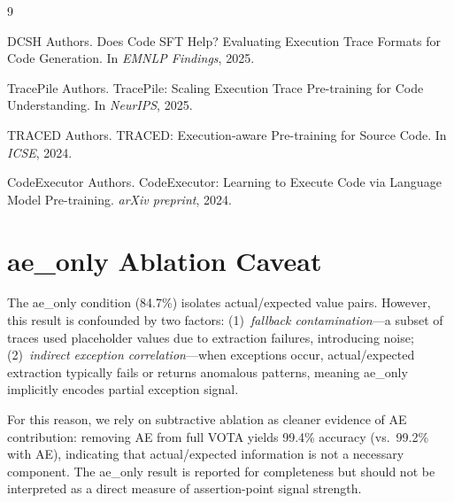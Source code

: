 \documentclass[11pt]{article}
\newcommand{\vota}{\textsc{VOTA}}
\begin{document}

\begin{thebibliography}{9}

{DCSH Authors}.
\newblock Does Code SFT Help? Evaluating Execution Trace Formats for Code Generation.
\newblock In \emph{EMNLP Findings}, 2025.

{TracePile Authors}.
\newblock TracePile: Scaling Execution Trace Pre-training for Code Understanding.
\newblock In \emph{NeurIPS}, 2025.

{TRACED Authors}.
\newblock TRACED: Execution-aware Pre-training for Source Code.
\newblock In \emph{ICSE}, 2024.

{CodeExecutor Authors}.
\newblock CodeExecutor: Learning to Execute Code via Language Model Pre-training.
\newblock \emph{arXiv preprint}, 2024.

\end{thebibliography}

\appendix
\section{ae\_only Ablation Caveat}
\label{app:ae_caveat}

The ae\_only condition (84.7\%) isolates actual/expected value pairs. However, this result is confounded by two factors: (1)~\emph{fallback contamination}---a subset of traces used placeholder values due to extraction failures, introducing noise; (2)~\emph{indirect exception correlation}---when exceptions occur, actual/expected extraction typically fails or returns anomalous patterns, meaning ae\_only implicitly encodes partial exception signal.

For this reason, we rely on subtractive ablation as cleaner evidence of AE contribution: removing AE from full \vota{} yields 99.4\% accuracy (vs.\ 99.2\% with AE), indicating that actual/expected information is not a necessary component. The ae\_only result is reported for completeness but should not be interpreted as a direct measure of assertion-point signal strength.
\end{document}
